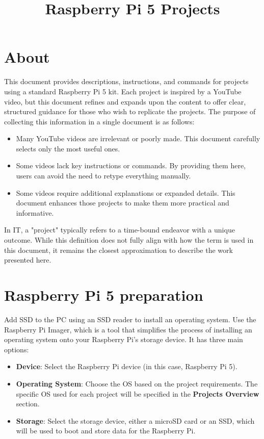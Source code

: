 \documentclass[a4paper,12pt]{article}
\title{Raspberry Pi 5 Projects}
\date{}
\begin{document}
\maketitle

\renewcommand{\cftsecleader}{\cftdotfill{\cftdotsep}}

\tableofcontents

\section*{About}

This document provides descriptions, instructions, and commands for projects using a standard Raspberry Pi 5 kit. Each project is inspired by a YouTube video, but this document refines and expands upon the content to offer clear, structured guidance for those who wish to replicate the projects. The purpose of collecting this information in a single document is as follows:

\begin{itemize}
\item Many YouTube videos are irrelevant or poorly made. This document carefully selects only the most useful ones.
\item Some videos lack key instructions or commands. By providing them here, users can avoid the need to retype everything manually.
\item Some videos require additional explanations or expanded details. This document enhances those projects to make them more practical and informative.
\end{itemize}

In IT, a "project" typically refers to a time-bound endeavor with a unique outcome. While this definition does not fully align with how the term is used in this document, it remains the closest approximation to describe the work presented here.

\section*{Raspberry Pi 5 preparation}

Add SSD to the PC using an SSD reader to install an operating system. Use the Raspberry Pi Imager, which is a tool that simplifies the process of installing an operating system onto your Raspberry Pi’s storage device. It has three main options:
\begin{itemize}
\item \textbf{Device}: Select the Raspberry Pi device (in this case, Raspberry Pi 5).
\item \textbf{Operating System}: Choose the OS based on the project requirements. The specific OS used for each project will be specified in the \textbf{Projects Overview} section.
\item \textbf{Storage}: Select the storage device, either a microSD card or an SSD, which will be used to boot and store data for the Raspberry Pi.
\end{itemize}
\end{document}
